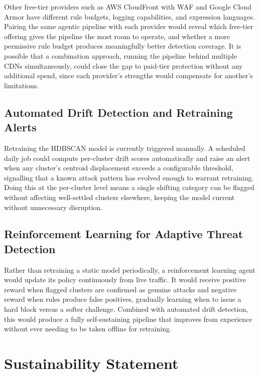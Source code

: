 \documentclass[12pt, a4paper]{report}   %
\begin{document}
Other free-tier providers such as AWS CloudFront with WAF and 
Google Cloud Armor have different rule budgets, logging 
capabilities, and expression languages. Pairing the same 
agentic pipeline with each provider would reveal which free-tier 
offering gives the pipeline the most room to operate, and whether 
a more permissive rule budget produces meaningfully better 
detection coverage. It is possible that a combination approach, 
running the pipeline behind multiple CDNs simultaneously, could 
close the gap to paid-tier protection without any additional 
spend, since each provider's strengths would compensate for 
another's limitations.

\section{Automated Drift Detection and Retraining Alerts}

Retraining the HDBSCAN model is currently triggered manually. 
A scheduled daily job could compute per-cluster drift scores 
automatically and raise an alert when any cluster's centroid 
displacement exceeds a configurable threshold, signalling that 
a known attack pattern has evolved enough to warrant retraining. 
Doing this at the per-cluster level means a single shifting 
category can be flagged without affecting well-settled clusters 
elsewhere, keeping the model current without unnecessary 
disruption.

\section{Reinforcement Learning for Adaptive Threat Detection}

Rather than retraining a static model periodically, a 
reinforcement learning agent would update its policy continuously 
from live traffic. It would receive positive reward when flagged 
clusters are confirmed as genuine attacks and negative reward 
when rules produce false positives, gradually learning when to 
issue a hard block versus a softer challenge. Combined with 
automated drift detection, this would produce a fully 
self-sustaining pipeline that improves from experience without 
ever needing to be taken offline for retraining.

\clearpage
\chapter{Sustainability Statement}
\end{document}
